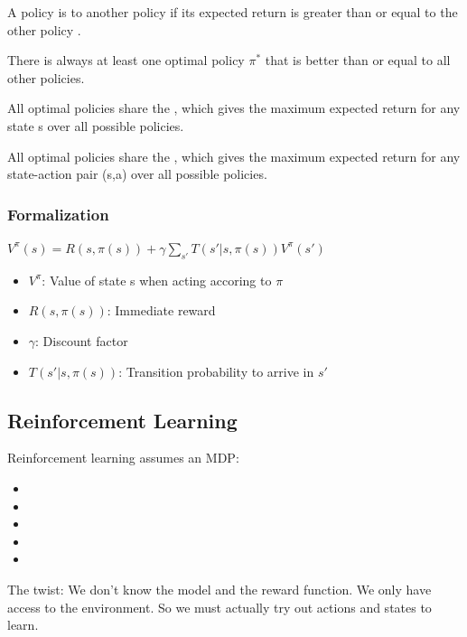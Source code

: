 \documentclass[
../../EiKI_Summary.tex,
]
{subfiles}
\begin{document}
A policy is  to another policy if its expected return is greater than or equal to the other policy .

There is always at least one optimal policy $\pi^\ast$ that is better than or equal to all other policies.

All optimal policies share the , which gives the maximum expected return for any state s over all possible policies.

All optimal policies share the , which gives the maximum expected return for any state-action pair (s,a) over all possible policies.

\subsubsection*{Formalization}

\begin{csmb*}
    $\displaystyle V^\pi(s)= R(s,\pi(s)) + \gamma \sum_{s'} T(s' | s, \pi(s)) V^\pi(s')$
\end{csmb*}

\begin{itemize}
    \item $V^\pi$: Value of state s when acting accoring to $\pi$
    \item $R(s,\pi(s))$: Immediate reward
    \item $\gamma$: Discount factor
    \item $T(s'|s,\pi(s))$: Transition probability to arrive in $s'$
\end{itemize}

\subsection{Reinforcement Learning}
Reinforcement learning assumes an MDP:
\begin{itemize}
    \item {}
    \item {}
    \item {}
    \item {}
    \item {}
\end{itemize}

The twist: We don't know the model and the reward function. We only have access to the environment. So we must actually try out actions and states to learn.
\end{document}
